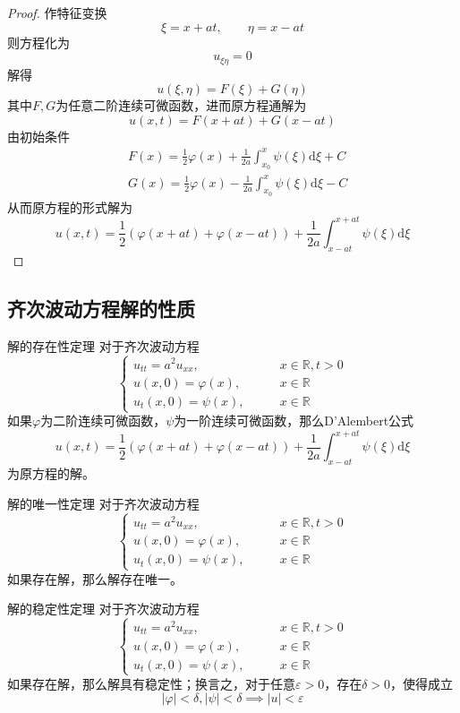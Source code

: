 \documentclass[lang = cn, scheme = chinese, thmcnt = section]{elegantbook}
\newcommand{\R}{\mathbb{R}}            %
\newcommand{\dd}{\mathrm{d}}           %
\begin{document}
\begin{proof}
	作特征变换%
	$$
	\xi=x+at,\qquad \eta=x-at
	$$
	则方程化为%
	$$
	u_{\xi\eta}=0
	$$
	解得%
	$$
	u(\xi,\eta)=F(\xi)+G(\eta)
	$$
	其中$F,G$为任意二阶连续可微函数，进而原方程通解为%
	$$
	u(x,t)=F(x+at)+G(x-at)
	$$
	由初始条件
	\begin{align*}
		& F(x)=\frac{1}{2}\varphi(x)+\frac{1}{2a}\int_{x_0}^{x}\psi(\xi)\dd\xi+C\\
		& G(x)=\frac{1}{2}\varphi(x)-\frac{1}{2a}\int_{x_0}^{x}\psi(\xi)\dd\xi-C
	\end{align*}
	从而原方程的形式解为%
	$$
	u(x,t)=\frac{1}{2}(\varphi(x+at)+\varphi(x-at))+\frac{1}{2a}\int_{x-at}^{x+at}\psi(\xi)\dd\xi
	$$
\end{proof}

\subsection{齐次波动方程解的性质}

\begin{theorem}{解的存在性定理}
	对于齐次波动方程%
	$$
	\begin{cases}
		u_{tt}=a^2u_{xx},\qquad & x\in \R,t>0\\
		u(x,0)=\varphi(x),\qquad & x\in \R\\
		u_t(x,0)=\psi(x),\qquad & x\in \R
	\end{cases}
	$$
	如果$\varphi$为二阶连续可微函数，$\psi$为一阶连续可微函数，那么D'Alembert公式
	$$
	u(x,t)=\frac{1}{2}(\varphi(x+at)+\varphi(x-at))+\frac{1}{2a}\int_{x-at}^{x+at}\psi(\xi)\dd\xi
	$$
	为原方程的解。
\end{theorem}

\begin{theorem}{解的唯一性定理}
	对于齐次波动方程
	$$
	\begin{cases}
		u_{tt}=a^2u_{xx},\qquad & x\in \R,t>0\\
		u(x,0)=\varphi(x),\qquad & x\in \R\\
		u_t(x,0)=\psi(x),\qquad & x\in \R
	\end{cases}
	$$
	如果存在解，那么解存在唯一。
\end{theorem}

\begin{theorem}{解的稳定性定理}
	对于齐次波动方程
	$$
	\begin{cases}
		u_{tt}=a^2u_{xx},\qquad & x\in \R,t>0\\
		u(x,0)=\varphi(x),\qquad & x\in \R\\
		u_t(x,0)=\psi(x),\qquad & x\in \R
	\end{cases}
	$$
	如果存在解，那么解具有稳定性；换言之，对于任意$\varepsilon>0$，存在$\delta>0$，使得成立%
	$$
	|\varphi|<\delta,|\psi|<\delta\implies|u|<\varepsilon
	$$
\end{theorem}
\end{document}
